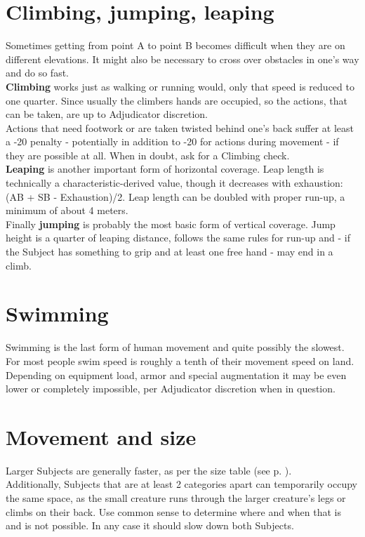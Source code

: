 \documentclass[11pt,a4paper,openany,dvipsnames]{book}
\begin{document}
	\section{Climbing, jumping, leaping}
	Sometimes getting from point A to point B becomes difficult when they are on different elevations. It might also be necessary to cross over obstacles in one’s way and do so fast.\\
	\textbf{Climbing} works just as walking or running would,
		only that speed is reduced to one quarter.
	Since usually the climbers hands are occupied,
		so the actions, that can be taken, are up to Adjudicator discretion.
	\\%
	Actions that need footwork or are taken twisted behind one’s back suffer at least a -20 penalty - potentially in addition to -20 for actions during movement - if they are possible at all. When in doubt, ask for a Climbing check.\\
	\textbf{Leaping} is another important form of horizontal coverage. Leap length is technically a characteristic-derived value, though it decreases with exhaustion: (AB + SB - Exhaustion)/2. Leap length can be doubled with proper run-up, a minimum of about 4 meters.\\
	Finally \textbf{jumping} is probably the most basic form of vertical coverage.
	Jump height is a quarter of leaping distance,
		follows the same rules for run-up and
		- if the Subject has something to grip and at least one free hand -
		may end in a climb.
	\section{Swimming}
	Swimming is the last form of human movement and quite possibly the slowest.
	For most people swim speed is roughly a tenth of their movement speed on land.
	Depending on equipment load, armor and special augmentation
		it may be even lower or completely impossible,
		per Adjudicator discretion when in question.
	\section{Movement and size}
	Larger Subjects are generally faster, as per the size table (see p. \pageref{sizestable}).\\
	Additionally, Subjects that are at least 2 categories apart
		can temporarily occupy the same space,
		as the small creature runs through the larger creature’s legs or climbs on their back.
	Use common sense to determine where and when that is and is not possible.
	In any case it should slow down both Subjects.
\end{document}
